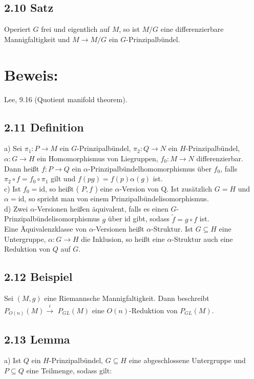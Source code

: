 \subsection*{2.10 Satz}
Operiert $G$ frei und eigentlich auf $M$, so ist $M / G$ eine differenzierbare Mannigfaltigkeit und $M \rightarrow M / G$ ein $G$-Prinzipalbündel.

\section*{Beweis:}
Lee, 9.16 (Quotient manifold theorem).

\subsection*{2.11 Definition}
a) Sei $\pi_{1}: P \rightarrow M$ ein $G$-Prinzipalbündel, $\pi_{2}: Q \rightarrow N$ ein $H$-Prinzipalbündel, $\alpha: G \rightarrow H$ ein Homomorphismus von Liegruppen, $f_{0}: M \rightarrow N$ differenzierbar. Dann heißt $f: P \rightarrow Q$ ein $\alpha$-Prinzipalbündelhomomorphismus über $f_{0}$, falls $\pi_{2} \circ f=f_{0} \circ \pi_{1}$ gilt und $f(p g)=f(p) \alpha(g)$ ist.\\
c) Ist $f_{0}=\mathrm{id}$, so heißt ( $P, f$ ) eine $\alpha$-Version von Q. Ist zusätzlich $G=H$ und $\alpha=\mathrm{id}$, so spricht man von einem Prinzipalbündelisomorphismus.\\
d) Zwei $\alpha$-Versionen heißen äquivalent, falls es einen $G$-Prinzipalbündelisomorphismus $g$ über id gibt, sodass $\tilde{f}=g \circ f$ ist.\\
Eine Äquivalenzklasse von $\alpha$-Versionen heißt $\alpha$-Struktur. Ist $G \subseteq H$ eine Untergruppe, $\alpha: G \rightarrow H$ die Inklusion, so heißt eine $\alpha$-Struktur auch eine Reduktion von $Q$ auf $G$.

\subsection*{2.12 Beispiel}
Sei $(M, g)$ eine Riemannsche Mannigfaltigkeit. Dann beschreibt $P_{O(n)}(M) \xrightarrow{i}$ $P_{G L}(M)$ eine $O(n)$-Reduktion von $P_{G L}(M)$.

\subsection*{2.13 Lemma}
a) Ist $Q$ ein $H$-Prinzipalbündel, $G \subseteq H$ eine abgeschlossene Untergruppe und $P \subseteq Q$ eine Teilmenge, sodass gilt:

